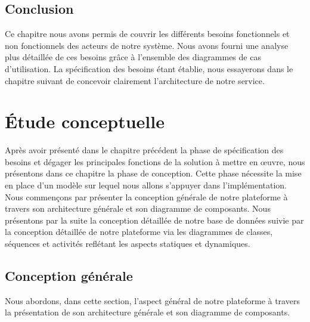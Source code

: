 \documentclass[12pt, ChapStyle1, oneside]{./Styles/Dea_Gsm}
\begin{document}
\section{Conclusion}
Ce chapitre nous avons permis de couvrir les différents besoins fonctionnels et non fonctionnels des acteurs de notre système. Nous avons fourni une analyse plus détaillée de ces besoins grâce à l’ensemble des diagrammes de cas d’utilisation. La spécification des besoins étant établie, nous essayerons dans le chapitre suivant de concevoir clairement l’architecture de notre service.
\chapter{Étude conceptuelle}
\vspace*{3cm}
Après avoir présenté dans le chapitre précédent la phase de spécification des besoins et dégager les principales fonctions de la solution à mettre en œuvre, nous présentons dans ce chapitre la phase de conception. Cette phase nécessite la mise en place d’un modèle sur lequel nous allons s’appuyer dans l’implémentation.
Nous commençons par présenter la conception générale de notre plateforme à travers son architecture générale et son diagramme de composants. Nous présentons par la suite la conception détaillée de notre base de données suivie par la conception détaillée de notre plateforme via les diagrammes de classes, séquences et activités reflétant les aspects statiques et dynamiques.
\pagebreak
\section{Conception générale}
Nous abordons, dans cette section, l’aspect général de notre plateforme à travers la présentation de son architecture générale et son diagramme de composants.
\end{document}
